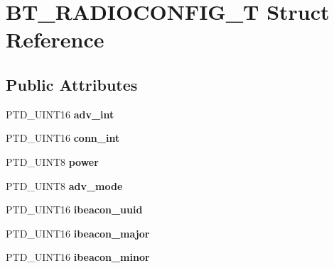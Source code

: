 \hypertarget{struct_b_t___r_a_d_i_o_c_o_n_f_i_g___t}{}\section{B\+T\+\_\+\+R\+A\+D\+I\+O\+C\+O\+N\+F\+I\+G\+\_\+\+T Struct Reference}
\label{struct_b_t___r_a_d_i_o_c_o_n_f_i_g___t}
\subsection*{Public Attributes}
\begin{DoxyCompactItemize}
\item 
\hypertarget{struct_b_t___r_a_d_i_o_c_o_n_f_i_g___t_ad33001fb2788fb7f7ee708d19501411d}{}P\+T\+D\+\_\+\+U\+I\+N\+T16 {\bfseries adv\+\_\+int}\label{struct_b_t___r_a_d_i_o_c_o_n_f_i_g___t_ad33001fb2788fb7f7ee708d19501411d}

\item 
\hypertarget{struct_b_t___r_a_d_i_o_c_o_n_f_i_g___t_a22d62d1efb45a3c59d1fabd7bf06a12d}{}P\+T\+D\+\_\+\+U\+I\+N\+T16 {\bfseries conn\+\_\+int}\label{struct_b_t___r_a_d_i_o_c_o_n_f_i_g___t_a22d62d1efb45a3c59d1fabd7bf06a12d}

\item 
\hypertarget{struct_b_t___r_a_d_i_o_c_o_n_f_i_g___t_a5f380703f2fdc83686b02f7195a79454}{}P\+T\+D\+\_\+\+U\+I\+N\+T8 {\bfseries power}\label{struct_b_t___r_a_d_i_o_c_o_n_f_i_g___t_a5f380703f2fdc83686b02f7195a79454}

\item 
\hypertarget{struct_b_t___r_a_d_i_o_c_o_n_f_i_g___t_acf7c07be6fbdc7a3e98a80c4d7f4ffdc}{}P\+T\+D\+\_\+\+U\+I\+N\+T8 {\bfseries adv\+\_\+mode}\label{struct_b_t___r_a_d_i_o_c_o_n_f_i_g___t_acf7c07be6fbdc7a3e98a80c4d7f4ffdc}

\item 
\hypertarget{struct_b_t___r_a_d_i_o_c_o_n_f_i_g___t_ad6dfca1289e15f0724b9bae23fe859c3}{}P\+T\+D\+\_\+\+U\+I\+N\+T16 {\bfseries ibeacon\+\_\+uuid}\label{struct_b_t___r_a_d_i_o_c_o_n_f_i_g___t_ad6dfca1289e15f0724b9bae23fe859c3}

\item 
\hypertarget{struct_b_t___r_a_d_i_o_c_o_n_f_i_g___t_aeb5cc04ec74670d4285fb2e75b718b88}{}P\+T\+D\+\_\+\+U\+I\+N\+T16 {\bfseries ibeacon\+\_\+major}\label{struct_b_t___r_a_d_i_o_c_o_n_f_i_g___t_aeb5cc04ec74670d4285fb2e75b718b88}

\item 
\hypertarget{struct_b_t___r_a_d_i_o_c_o_n_f_i_g___t_a7fa1e31f642afc5ce4e2021ca9d9a426}{}P\+T\+D\+\_\+\+U\+I\+N\+T16 {\bfseries ibeacon\+\_\+minor}\label{struct_b_t___r_a_d_i_o_c_o_n_f_i_g___t_a7fa1e31f642afc5ce4e2021ca9d9a426}


\end{DoxyCompactItemize}
